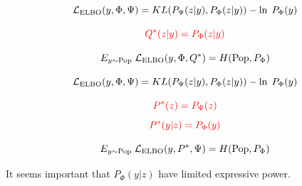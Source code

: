 
$${\cal L}_{\mathrm{ELBO}}(y,\Phi,\Psi) = KL(P_\Psi(z|y),P_{\Phi}(z|y)) - \ln\;P_{\Phi}(y)$$

\vfill
$${\color{red} Q^*(z|y) = P_\Phi(z|y)}$$

\vfill
$$E_{y \sim \mathrm{Pop}}\;{\cal L}_{\mathrm{ELBO}}(y,\Phi,Q^*) = H(\mathrm{Pop},P_\Phi)$$


$${\cal L}_{\mathrm{ELBO}}(y,\Phi,\Psi) = KL(P_\Psi(z|y),P_{\Phi}(z|y)) - \ln\;P_{\Phi}(y)$$

$${\color{red} P^*(z) = P_\Psi(z)}$$
$${\color{red} P^*(y|z) = P_\Phi(y)}$$

$$E_{y \sim \mathrm{Pop}}\;{\cal L}_{\mathrm{ELBO}}(y,P^*,\Psi) = H(\mathrm{Pop},P_\Phi)$$

\vfill
It seems important that $P_\Phi(y|z)$ have limited expressive power.




